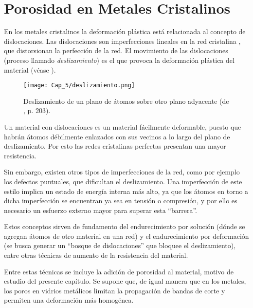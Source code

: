 
\section{Porosidad en Metales Cristalinos}
\label{S5_2}

En los metales cristalinos la deformación plástica está relacionada al concepto de dislocaciones. Las dislocaciones son imperfecciones lineales en
la red cristalina \citep{askeland98}, que distorsionan la perfección de la red. El movimiento de las dislocaciones (proceso llamado
\textit{deslizamiento}) es el que provoca la deformación plástica del material (véase ).

\begin{figure}[h!]
\centering
  \texttt{[image: Cap\_5/deslizamiento.png]}
  \caption[Deslizamiento de un plano de átomos sobre otro plano adyacente]{Deslizamiento de un plano de átomos sobre otro plano adyacente
  (de \cite{shackelford04}, p. 203).}
  \label{C5:fg:dislocaciones}
\end{figure}

Un material con dislocaciones es un material fácilmente deformable, puesto que habrán átomos débilmente enlazados con sus vecinos a lo largo del plano de deslizamiento. Por esto las redes cristalinas perfectas presentan una mayor resistencia.

Sin embargo, existen otros tipos de imperfecciones de la red, como por ejemplo los defectos puntuales, que dificultan el deslizamiento. Una imperfección de este estilo implica un estado de energía interna más alto, ya que los átomos en torno a dicha imperfección se encuentran ya sea en tensión o compresión, y por ello es necesario un esfuerzo externo mayor para superar esta ``barrera''.

Estos conceptos sirven de fundamento del endurecimiento por solución (dónde se agregan átomos de otro material en una red) y el endurecimiento por deformación (se busca generar un ``bosque de dislocaciones'' que bloquee el deslizamiento), entre otras técnicas de aumento de la resistencia del material. 

Entre estas técnicas se incluye la adición de porosidad al material, motivo de estudio del presente capítulo. Se supone que, de igual manera que en los metales, los poros en vidrios metálicos limitan la propagación de bandas de corte y permiten una deformación más homogénea.

